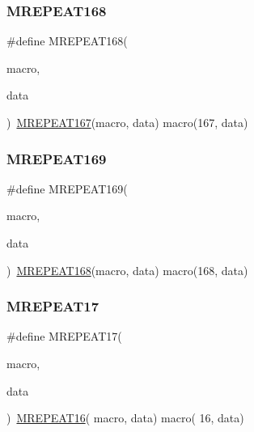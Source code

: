 \mbox{\label{group__group__sam0__utils__mrepeat_ga4aa9bd592bf0f9b8f03254451d8693da}} 
\subsubsection{\texorpdfstring{MREPEAT168}{MREPEAT168}}
{\footnotesize\ttfamily \#define M\+R\+E\+P\+E\+A\+T168(\begin{DoxyParamCaption}\item[{}]{macro,  }\item[{}]{data }\end{DoxyParamCaption})~\mbox{\hyperlink{group__group__sam0__utils__mrepeat_ga252652614e5e3cb056e487b105bd598c}{M\+R\+E\+P\+E\+A\+T167}}(macro, data)   macro(167, data)}

\mbox{\label{group__group__sam0__utils__mrepeat_ga1ae14784af3853b01de5837b32a0fdd6}} 
\subsubsection{\texorpdfstring{MREPEAT169}{MREPEAT169}}
{\footnotesize\ttfamily \#define M\+R\+E\+P\+E\+A\+T169(\begin{DoxyParamCaption}\item[{}]{macro,  }\item[{}]{data }\end{DoxyParamCaption})~\mbox{\hyperlink{group__group__sam0__utils__mrepeat_ga4aa9bd592bf0f9b8f03254451d8693da}{M\+R\+E\+P\+E\+A\+T168}}(macro, data)   macro(168, data)}

\mbox{\label{group__group__sam0__utils__mrepeat_gaff45aee56d734a3bdf90cdd86b5693d9}} 
\subsubsection{\texorpdfstring{MREPEAT17}{MREPEAT17}}
{\footnotesize\ttfamily \#define M\+R\+E\+P\+E\+A\+T17(\begin{DoxyParamCaption}\item[{}]{macro,  }\item[{}]{data }\end{DoxyParamCaption})~\mbox{\hyperlink{group__group__sam0__utils__mrepeat_gaf3c066d33ccd6fd8378495955121baae}{M\+R\+E\+P\+E\+A\+T16}}( macro, data)   macro( 16, data)}

